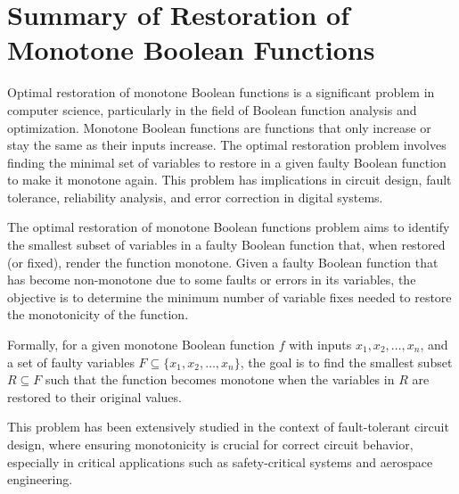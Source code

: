 \documentclass{article}
\renewcommand{\_}{\ifincsname_\else\legacyunderscore\fi}
\begin{document}
\section*{Summary of Restoration of Monotone Boolean Functions}
Optimal restoration of monotone Boolean functions is a significant problem in computer science, particularly in the field of Boolean function analysis and optimization. Monotone Boolean functions are functions that only increase or stay the same as their inputs increase. The optimal restoration problem involves finding the minimal set of variables to restore in a given faulty Boolean function to make it monotone again. This problem has implications in circuit design, fault tolerance, reliability analysis, and error correction in digital systems.

The optimal restoration of monotone Boolean functions problem aims to identify the smallest subset of variables in a faulty Boolean function that, when restored (or fixed), render the function monotone. Given a faulty Boolean function that has become non-monotone due to some faults or errors in its variables, the objective is to determine the minimum number of variable fixes needed to restore the monotonicity of the function.

Formally, for a given monotone Boolean function \( f \) with inputs \( x_1, x_2, \ldots, x_n \), and a set of faulty variables \( F \subseteq \{x_1, x_2, \ldots, x_n\} \), the goal is to find the smallest subset \( R \subseteq F \) such that the function becomes monotone when the variables in \( R \) are restored to their original values.

This problem has been extensively studied in the context of fault-tolerant circuit design, where ensuring monotonicity is crucial for correct circuit behavior, especially in critical applications such as safety-critical systems and aerospace engineering.
\end{document}
